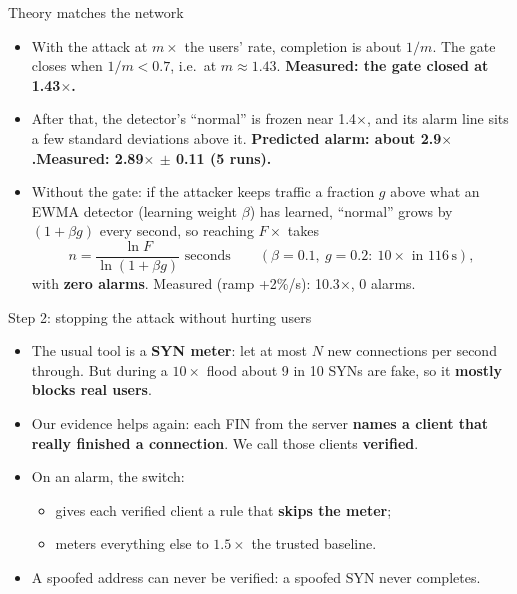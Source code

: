 \documentclass[aspectratio=169,11pt]{beamer}
\newcommand{\key}[1]{\textcolor{gate}{\textbf{#1}}}
\begin{document}
\begin{frame}{Theory matches the network}
\begin{itemize}\setlength\itemsep{3mm}
\item With the attack at $m\times$ the users' rate, completion is about $1/m$.
      The gate closes when $1/m < 0.7$, i.e.\ at $m \approx \mathbf{1.43}$.
      \textbf{Measured: the gate closed at 1.43$\times$.}
\item After that, the detector's ``normal'' is frozen near 1.4$\times$, and its alarm line sits a
      few standard deviations above it.
      \textbf{Predicted alarm: about 2.9$\times$.\quad Measured: 2.89$\times$ $\pm$ 0.11 (5 runs).}
\item Without the gate: if the attacker keeps traffic a fraction $g$ above what an EWMA detector
      (learning weight $\beta$) has learned, ``normal'' grows by $(1+\beta g)$ every second, so
      reaching $F\times$ takes
      \[ n = \frac{\ln F}{\ln(1+\beta g)} \text{ seconds} \qquad
         (\beta = 0.1,\ g = 0.2:\ 10\times \text{ in } 116\,\text{s}),\]
      with \textbf{zero alarms}. Measured (ramp +2\%/s): 10.3$\times$, 0 alarms.
\end{itemize}
\end{frame}

\begin{frame}{Step 2: stopping the attack without hurting users}
\begin{itemize}\setlength\itemsep{2.5mm}
\item The usual tool is a \textbf{SYN meter}: let at most $N$ new connections per second through.
      But during a $10\times$ flood about 9 in 10 SYNs are fake, so it \key{mostly blocks real users}.
\item Our evidence helps again: each FIN from the server \textbf{names a client that really
      finished a connection}. We call those clients \key{verified}.
\item On an alarm, the switch:
      \begin{itemize}
      \item gives each verified client a rule that \textbf{skips the meter};
      \item meters everything else to $1.5\times$ the trusted baseline.
      \end{itemize}
\item A spoofed address can never be verified: a spoofed SYN never completes.
\end{itemize}
\end{frame}
\end{document}
